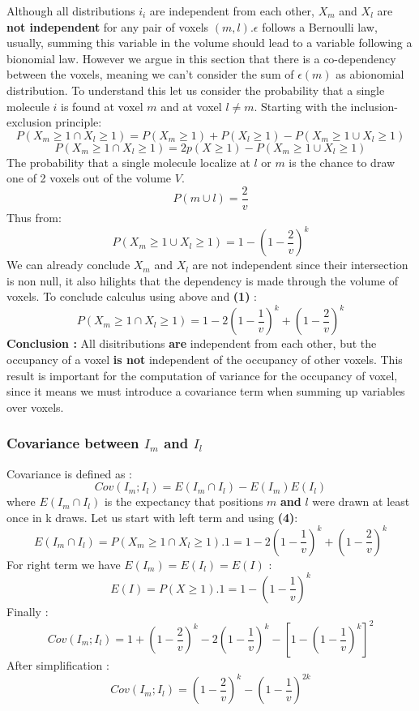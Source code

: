 \documentclass{article}
\begin{document}
Although all distributions $i_i$ are independent from each other, $X_m$ and $X_l$ are \textbf{not independent} for
any pair of voxels $(m,l)$.$\epsilon$ follows a Bernoulli law, usually, summing this variable in the volume should
lead to a variable following a bionomial law. However we argue in this section that there is a co-dependency between
the voxels, meaning we can't consider the sum of $\epsilon (m)$ as abionomial distribution. 
To understand this let us consider the probability that a single molecule $i$ is found at voxel $m$ and at voxel $l \neq m$.
Starting with the inclusion-exclusion principle:
\[
P(X_m \geq 1 \cap X_l \geq 1) = P(X_m \geq 1) + P(X_l \geq 1) - P(X_m\geq 1 \cup X_l\geq 1)
\]
\[
P(X_m \geq 1 \cap X_l \geq 1) = 2p(X \geq 1) - P(X_m\geq 1 \cup X_l\geq 1)
\]
The probability that a single molecule localize at $l$ or $m$ is the chance to draw one of 2 voxels out of the volume $V$.
\[
P(m \cup l) = \frac{2}{v}
\]
Thus from:
\[
P({X_m\geq 1 \cup X_l\geq 1}) = 1 - (1-\frac{2}{v})^{k}
\]
We can already conclude $X_m$ and $X_l$ are not independent since their intersection is non null, it also hilights that the dependency is made through
the volume of voxels. To conclude calculus using above and \textbf{(1)} :
\begin{equation}
    P(X_m \geq 1 \cap X_l \geq 1) =  1 - 2(1-\frac{1}{v})^{k} + (1-\frac{2}{v})^{k} 
\end{equation}
\textbf{Conclusion : }All disitributions \textbf{are} independent from each other, but the occupancy of a voxel \textbf{is not} independent of the
occupancy of other voxels. This result is important for the computation of variance for the occupancy of voxel, since it means we must introduce a 
covariance term when summing up variables over voxels.

\subsubsection{Covariance between $I_m$ and $I_l$}

Covariance is defined as :
\[
Cov(I_m;I_l) = E(I_m \cap I_l) - E(I_m)E(I_l)
\]
where $E(I_m \cap I_l)$ is the expectancy that positions $m$ \textbf{and} $l$ were drawn at least once in k draws. Let us start with left term  and 
using \textbf{(4)}:
\[
E(I_m \cap I_l) = P(X_m \geq 1 \cap X_l \geq 1).1 = 1 - 2(1-\frac{1}{v})^{k} + (1-\frac{2}{v})^{k}
\]
For right term we have $E(I_m) = E(I_l) = E(I)$ :
\[
E(I) = P(X\geq1).1 = 1-(1 - \frac{1}{v})^k
\]
Finally :
\[
Cov(I_m;I_l) =  1 + (1-\frac{2}{v})^{k} - 2(1-\frac{1}{v})^{k} - [1-(1 - \frac{1}{v})^k]^2
\]
After simplification :
\begin{equation}
    Cov(I_m;I_l) = (1-\frac{2}{v})^k - (1-\frac{1}{v})^{2k}
\end{equation}
\end{document}
